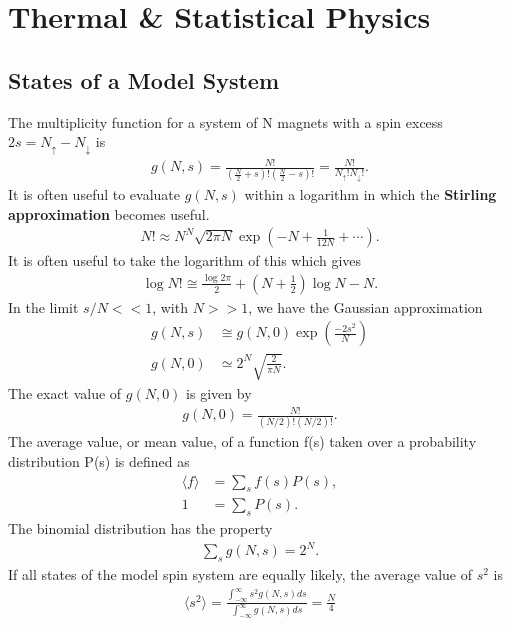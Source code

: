 \chapter{Thermal \& Statistical Physics}
\thispagestyle{fancy}

\begin{multicols}{2}
	\section{States of a Model System}
	The multiplicity function for a system of N magnets with a spin excess $2s=	N_{\uparrow}-N_{\downarrow}$ is
	\begin{align}
		g(N,s)=\frac{N!}{(\frac{N}{2}+s)!(\frac{N}{2}-s)!} = \frac{N!}{N_{\uparrow}!N_{\downarrow}!}.
	\end{align}
	It is often useful to evaluate $g(N,s)$ within a logarithm in which the \textbf{Stirling approximation} becomes useful.
	\begin{align}
		N! \approx N^N\sqrt{2\pi N} \exp\left(-N+\frac{1}{12N}+\cdots\right).
	\end{align}
	It is often useful to take the logarithm of this which gives
	\begin{align}
		\log N!\cong \frac{\log 2\pi}{2}+\left(N+\frac{1}{2}\right)
		\log N-N.
	\end{align}
	In the limit $s/N << 1$, with $N>>1$, we have the Gaussian approximation 
	\begin{align}
		g(N,s) &\cong g(N,0)\exp\left(\frac{-2s^2}{N}\right) \\
		g(N,0)&\simeq 2^N\sqrt{\frac{2}{\pi N}}.
	\end{align}
	The exact value of $g(N,0)$ is given by
	\begin{align}
		g(N,0) = \frac{N!}{(N/2)!(N/2)!}.
	\end{align}
	The average value, or mean value, of a function f(s) taken over a probability distribution P(s) is defined as
	\begin{align}
		\langle f \rangle &=\sum_{s} f(s)P(s), \\
		1 &= \sum_{s} P(s).
	\end{align}
	The binomial distribution has the property 
	\begin{align}
		\sum_{s}g(N,s)=2^N.
	\end{align}
	If all states of the model spin system are equally likely, the average value of $s^2$ is
	\begin{align}
		\langle s^2 \rangle = \frac{\int_{-\infty}^{\infty}s^2 g(N,s) ds }{\int_{-\infty}^{\infty} g(N,s) ds } = \frac{N}{4}

\end{align}
\end{multicols}
